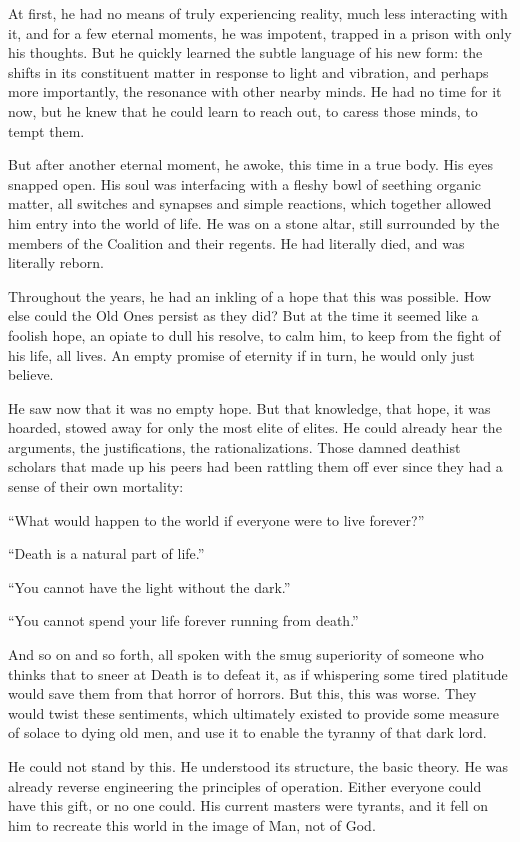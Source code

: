 At first, he had no means of truly experiencing reality, much less interacting with it, and for a few eternal moments, he was impotent, trapped in a prison with only his thoughts. But he quickly learned the subtle language of his new form: the shifts in its constituent matter in response to light and vibration, and perhaps more importantly, the resonance with other nearby minds. He had no time for it now, but he knew that he could learn to reach out, to caress those minds, to tempt them.

But after another eternal moment, he awoke, this time in a true body. His eyes snapped open. His soul was interfacing with a fleshy bowl of seething organic matter, all switches and synapses and simple reactions, which together allowed him entry into the world of life. He was on a stone altar, still surrounded by the members of the Coalition and their regents. He had literally died, and was literally reborn.

Throughout the years, he had an inkling of a hope that this was possible. How else could the Old Ones persist as they did? But at the time it seemed like a foolish hope, an opiate to dull his resolve, to calm him, to keep from the fight of his life, all lives. An empty promise of eternity if in turn, he would only just believe.

He saw now that it was no empty hope. But that knowledge, that hope, it was hoarded, stowed away for only the most elite of elites. He could already hear the arguments, the justifications, the rationalizations. Those damned deathist scholars that made up his peers had been rattling them off ever since they had a sense of their own mortality:

“What would happen to the world if everyone were to live forever?”

“Death is a natural part of life.”

“You cannot have the light without the dark.”

“You cannot spend your life forever running from death.”

And so on and so forth, all spoken with the smug superiority of someone who thinks that to sneer at Death is to defeat it, as if whispering some tired platitude would save them from that horror of horrors. But this, this was worse. They would twist these sentiments, which ultimately existed to provide some measure of solace to dying old men, and use it to enable the tyranny of that dark lord.

He could not stand by this. He understood its structure, the basic theory. He was already reverse engineering the principles of operation. Either everyone could have this gift, or no one could. His current masters were tyrants, and it fell on him to recreate this world in the image of Man, not of God.

